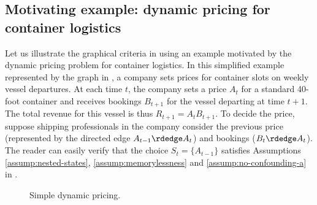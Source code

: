 \documentclass[12pt,a4paper]{article}
\theoremstyle{definition}
\begin{document}
\subsection{Motivating example: dynamic pricing for container
  logistics}

\label{sec:motivating-example}

Let us illustrate the graphical criteria in 
using an example motivated by the dynamic pricing problem for
container logistics. In this simplified example represented by the
graph in , a company sets prices
for container slots on weekly vessel departures. At each time $t$, the
company sets a price $A_t$ for a standard 40-foot container and
receives bookings $B_{t+1}$ for the vessel departing at time
$t+1$. The total revenue for this vessel is thus $R_{t+1} = A_t
B_{t+1}$. To decide the price, suppose shipping professionals in
the company consider the previous price (represented by the directed
edge $A_{t-1} \rdedge A_t$) and bookings ($B_t
\rdedge A_t$). The reader can easily verify
that the choice $S_t =
\{A_{t-1}\}$ satisfies Assumptions \ref{assump:nested-states},
\ref{assump:memorylessness} and \ref{assump:no-confounding-a} in
.

\begin{figure}[t]
  \centering
  \caption{Simple dynamic pricing.}
  \label{fig:toy_pricing_template}
\end{figure}
\end{document}
